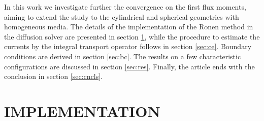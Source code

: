\documentclass{ictt26}
\begin{document}

In this work we investigate further the convergence on the first flux moments, aiming to extend the study to the cylindrical and spherical geometries with homogeneous media. The details of the implementation of the Ronen method in the diffusion solver are presented in section \ref{sec:impl}, while the procedure to estimate the currents by the integral transport operator follows in section \ref{sec:ce}. Boundary conditions are derived in section \ref{sec:bc}. The results on a few characteristic configurations are discussed in section \ref{sec:res}. Finally, the article ends with the conclusion in section \ref{sec:cncls}.


\section{IMPLEMENTATION}
\label{sec:impl}
\end{document}

